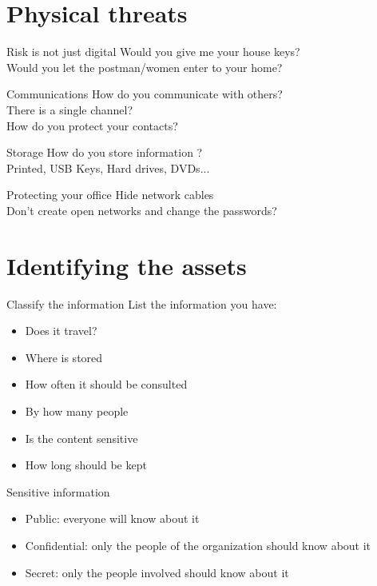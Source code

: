 \documentclass[11pt]{beamer}
\begin{document}
\section{Physical threats}
\begin{frame}{Risk is not just digital}
Would you give me your house keys?\\
Would you let the postman/women enter to  your home?
\end{frame}
\begin{frame}{Communications}
How do you communicate with others?\\
There is a single channel?\\
How do you protect your contacts?
\end{frame}
\begin{frame}{Storage}
How do you store information ?\\
Printed, USB Keys, Hard drives, DVDs...
\end{frame}
\begin{frame}{Protecting your office}
Hide network cables\\
Don't create open networks and change the passwords?\\
\end{frame}
\section{Identifying the assets}
\begin{frame}{Classify the information}
List the information you have:
\begin{itemize}
\item Does it travel?
\item Where is stored
\item How often it should be consulted
\item By how many people
\item Is the content sensitive
\item How long should be kept
\end{itemize}
\end{frame}
\begin{frame}{Sensitive information}
\begin{itemize}
\item Public: everyone will know about it
\item Confidential: only the people of the organization should know about it
\item Secret: only the people involved should know about it
\end{itemize}
\end{frame}
\end{document}
